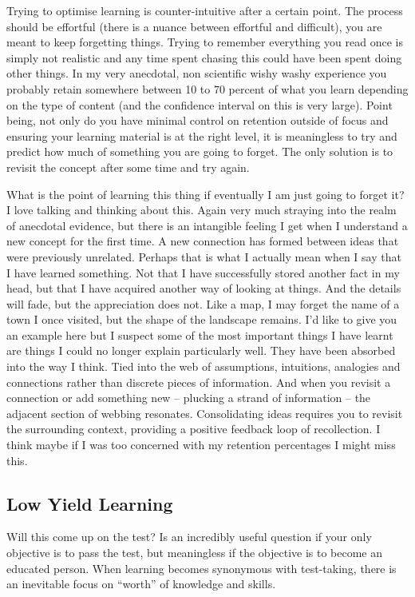 \documentclass{article}
\begin{document}
Trying to optimise learning is counter-intuitive after a certain point. The process should be effortful (there is a nuance between effortful and difficult), you are meant to keep forgetting things. Trying to remember everything you read once is simply not realistic and any time spent chasing this could have been spent doing other things. In my very anecdotal, non scientific wishy washy experience you probably retain somewhere between 10 to 70 percent of what you learn depending on the type of content (and the confidence interval on this is very large). Point being, not only do you have minimal control on retention outside of focus and ensuring your learning material is at the right level, it is meaningless to try and predict how much of something you are going to forget. The only solution is to revisit the concept after some time and try again. 

What is the point of learning this thing if eventually I am just going to forget it? I love talking and thinking about this. Again very much straying into the realm of anecdotal evidence, but there is an intangible feeling I get when I understand a new concept for the first time. A new connection has formed between ideas that were previously unrelated. Perhaps that is what I actually mean when I say that I have learned something. Not that I have successfully stored another fact in my head, but that I have acquired another way of looking at things. And the details will fade, but the appreciation does not. Like a map, I may forget the name of a town I once visited, but the shape of the landscape remains. I'd like to give you an example here but I suspect some of the most important things I have learnt are things I could no longer explain particularly well. They have been absorbed into the way I think. Tied into the web of assumptions, intuitions, analogies and connections rather than discrete pieces of information. And when you revisit a connection or add something new – plucking a strand of information – the adjacent section of webbing resonates. Consolidating ideas requires you to revisit the surrounding context, providing a positive feedback loop of recollection. I think maybe if I was too concerned with my retention percentages I might miss this. 

\subsection*{Low Yield Learning}

Will this come up on the test? Is an incredibly useful question if your only objective is to pass the test, but meaningless if the objective is to become an educated person. When learning becomes synonymous with test-taking, there is an inevitable focus on ``worth'' of knowledge and skills. 
\end{document}

